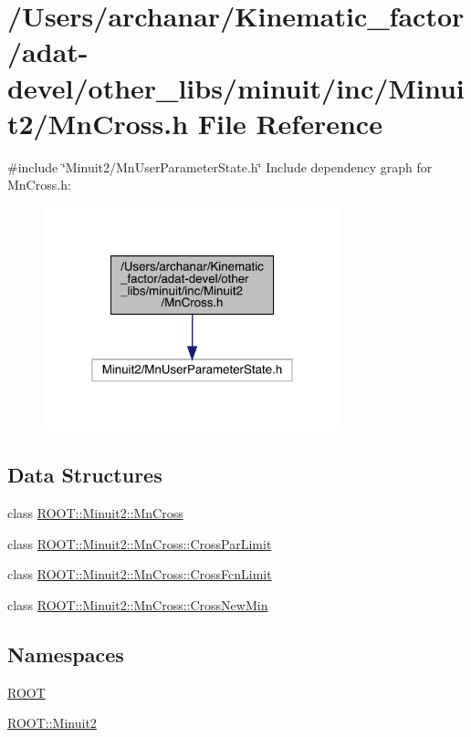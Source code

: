 \hypertarget{adat-devel_2other__libs_2minuit_2inc_2Minuit2_2MnCross_8h}{}\section{/\+Users/archanar/\+Kinematic\+\_\+factor/adat-\/devel/other\+\_\+libs/minuit/inc/\+Minuit2/\+Mn\+Cross.h File Reference}
\label{adat-devel_2other__libs_2minuit_2inc_2Minuit2_2MnCross_8h}
{\ttfamily \#include \char`\"{}Minuit2/\+Mn\+User\+Parameter\+State.\+h\char`\"{}}\newline
Include dependency graph for Mn\+Cross.\+h\+:
\nopagebreak
\begin{figure}[H]
\begin{center}
\leavevmode
\includegraphics[width=244pt]{da/d35/adat-devel_2other__libs_2minuit_2inc_2Minuit2_2MnCross_8h__incl}
\end{center}
\end{figure}
\subsection*{Data Structures}
\begin{DoxyCompactItemize}
\item 
class \mbox{\hyperlink{classROOT_1_1Minuit2_1_1MnCross}{R\+O\+O\+T\+::\+Minuit2\+::\+Mn\+Cross}}
\item 
class \mbox{\hyperlink{classROOT_1_1Minuit2_1_1MnCross_1_1CrossParLimit}{R\+O\+O\+T\+::\+Minuit2\+::\+Mn\+Cross\+::\+Cross\+Par\+Limit}}
\item 
class \mbox{\hyperlink{classROOT_1_1Minuit2_1_1MnCross_1_1CrossFcnLimit}{R\+O\+O\+T\+::\+Minuit2\+::\+Mn\+Cross\+::\+Cross\+Fcn\+Limit}}
\item 
class \mbox{\hyperlink{classROOT_1_1Minuit2_1_1MnCross_1_1CrossNewMin}{R\+O\+O\+T\+::\+Minuit2\+::\+Mn\+Cross\+::\+Cross\+New\+Min}}
\end{DoxyCompactItemize}
\subsection*{Namespaces}
\begin{DoxyCompactItemize}
\item 
 \mbox{\hyperlink{namespaceROOT}{R\+O\+OT}}
\item 
 \mbox{\hyperlink{namespaceROOT_1_1Minuit2}{R\+O\+O\+T\+::\+Minuit2}}
\end{DoxyCompactItemize}
